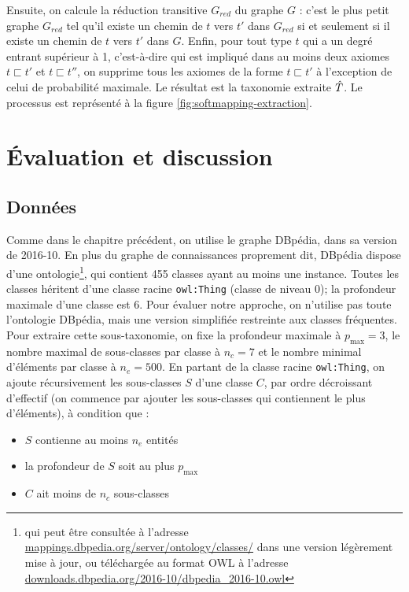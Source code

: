 Ensuite, on calcule la réduction transitive $G_{red}$ du graphe $G$ : c'est le plus petit graphe $G_{red}$ tel qu'il existe un chemin de $t$ vers $t'$ dans $G_{red}$ si et seulement si il existe un chemin de $t$ vers $t'$ dans $G$. Enfin, pour tout type $t$ qui a un degré entrant supérieur à 1, c'est-à-dire qui est impliqué dans au moins deux axiomes $t \sqsubset t'$ et $t\sqsubset t''$, on supprime tous les axiomes de la forme $t \sqsubset t'$ à l'exception de celui de probabilité maximale. Le résultat est la taxonomie extraite $\hat{T}$. Le processus est représenté à la figure \ref{fig:softmapping-extraction}.


\section{Évaluation et discussion}
\label{sec:te-evaluation}

\subsection{Données}
\label{sec:te-data}

Comme dans le chapitre précédent, on utilise le graphe DBpédia, dans sa version de 2016-10. En plus du graphe de connaissances proprement dit, DBpédia dispose d'une ontologie\footnote{qui peut être consultée à l'adresse \href{http://mappings.dbpedia.org/server/ontology/classes/}{mappings.dbpedia.org/server/ontology/classes/} dans une version légèrement mise à jour, ou téléchargée au format OWL à l'adresse \href{http://downloads.dbpedia.org/2016-10/dbpedia\_2016-10.owl}{downloads.dbpedia.org/2016-10/dbpedia\_2016-10.owl}}, qui contient 455 classes ayant au moins une instance. Toutes les classes héritent d'une classe racine \texttt{owl:Thing} (classe de niveau 0); la profondeur maximale d'une classe est 6. Pour évaluer notre approche, on n'utilise pas toute l'ontologie DBpédia, mais une version simplifiée restreinte aux classes fréquentes. %
Pour extraire cette sous-taxonomie, on fixe la profondeur maximale à $p_{\max}=3$, le nombre maximal de sous-classes par classe à $n_c=7$ et le nombre minimal d'éléments par classe à $n_e=500$. En partant de la classe racine \texttt{owl:Thing}, on ajoute récursivement les sous-classes $S$ d'une classe $C$, par ordre décroissant d'effectif (on commence par ajouter les sous-classes qui contiennent le plus d'éléments), à condition que : 
\begin{itemize}
    \item $S$ contienne au moins $n_e$ entités
    \item la profondeur de $S$ soit au plus $p_{\max}$
    \item $C$ ait moins de $n_c$ sous-classes
\end{itemize}

